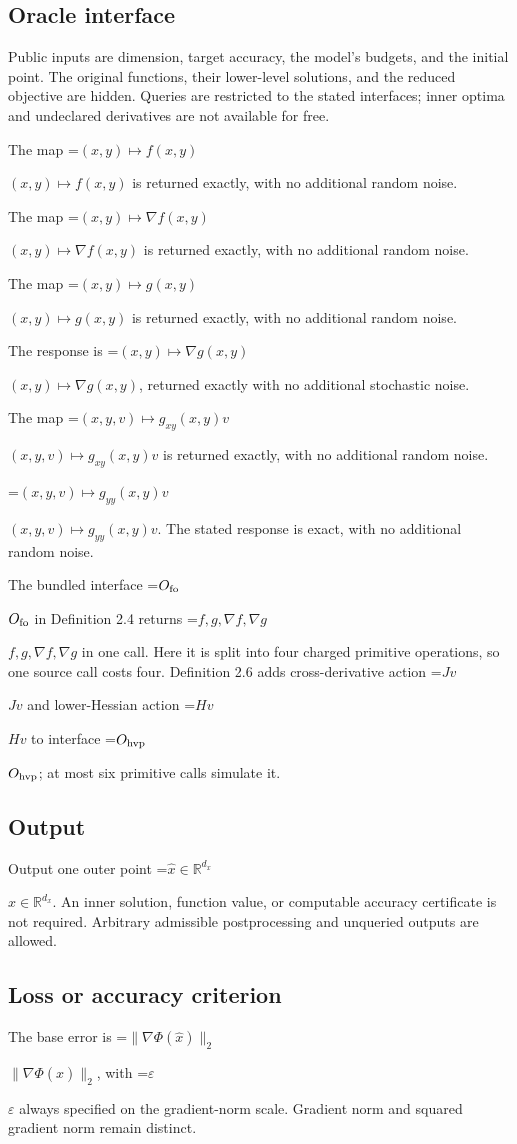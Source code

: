 \documentclass[10pt,a4paper]{article}
\newcommand{\AtlasMath}[1]{\par\begingroup\centering\setbox0=\hbox{$\displaystyle #1$}\ifdim\wd0>1.4\linewidth\typeout{ATLAS WIDE FORMULA: \the\wd0}\fi\ifdim\wd0>\linewidth\resizebox{\linewidth}{!}{\box0}\else\box0\fi\par\endgroup}
\newcommand{\AtlasInlineMath}[1]{\begingroup\setbox0=\hbox{$#1$}\ifdim\wd0>.4\linewidth\endgroup\AtlasMath{#1}\else\endgroup$#1$\fi}
\begin{document}
\subsection{Oracle interface}
Public inputs are dimension, target accuracy, the model's budgets, and the initial point. The original functions, their lower-level solutions, and the reduced objective are hidden. Queries are restricted to the stated interfaces; inner optima and undeclared derivatives are not available for free.

The map \AtlasInlineMath{(x,y)\mapsto f(x,y)} is returned exactly, with no additional random noise.

The map \AtlasInlineMath{(x,y)\mapsto\nabla f(x,y)} is returned exactly, with no additional random noise.

The map \AtlasInlineMath{(x,y)\mapsto g(x,y)} is returned exactly, with no additional random noise.

The response is \AtlasInlineMath{(x,y)\longmapsto \nabla g(x,y)}, returned exactly with no additional stochastic noise.

The map \AtlasInlineMath{(x,y,v)\mapsto g_{xy}(x,y)v} is returned exactly, with no additional random noise.

\AtlasInlineMath{(x,y,v)\longmapsto g_{yy}(x,y)v}. The stated response is exact, with no additional random noise.

The bundled interface \AtlasInlineMath{O_{\rm fo}} in Definition 2.4 returns \AtlasInlineMath{f,g,\nabla f,\nabla g} in one call. Here it is split into four charged primitive operations, so one source call costs four. Definition 2.6 adds cross-derivative action \AtlasInlineMath{Jv} and lower-Hessian action \AtlasInlineMath{Hv} to interface \AtlasInlineMath{O_{\rm hvp}}; at most six primitive calls simulate it.

\subsection{Output}
Output one outer point \AtlasInlineMath{\widehat{x}\in\mathbb{R}^{d_x}}. An inner solution, function value, or computable accuracy certificate is not required. Arbitrary admissible postprocessing and unqueried outputs are allowed.

\subsection{Loss or accuracy criterion}
The base error is \AtlasInlineMath{\|\nabla\Phi(\widehat{x})\|_2}, with \AtlasInlineMath{\varepsilon} always specified on the gradient-norm scale. Gradient norm and squared gradient norm remain distinct.
\end{document}
